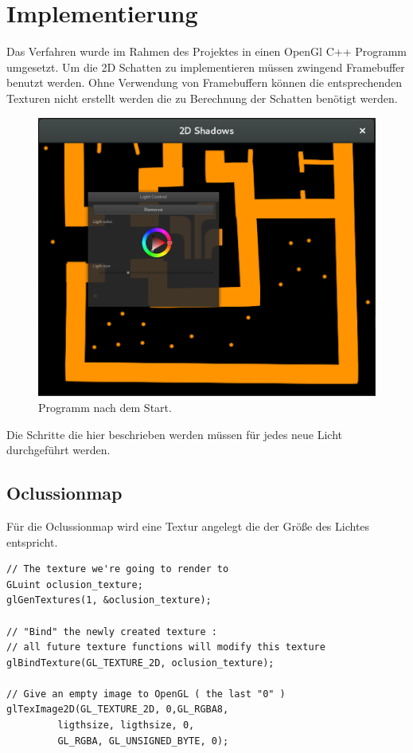 \chapter{Implementierung}
Das Verfahren wurde im Rahmen des Projektes in einen OpenGl C++ Programm umgesetzt.
Um die 2D Schatten zu implementieren müssen zwingend Framebuffer benutzt werden.
Ohne Verwendung von Framebuffern können die entsprechenden Texturen nicht erstellt werden die zu Berechnung der Schatten benötigt werden. 
\begin{figure}[h]
	\centering
	\includegraphics[scale=0.25]{images/Bildschirmfoto_1.png}
	\caption{Programm nach dem Start.}
	\label{p_1}
\end{figure}

Die Schritte die hier beschrieben werden müssen für jedes neue Licht durchgeführt werden.
\newpage
\section{Oclussionmap}

Für die Oclussionmap wird eine Textur angelegt die der Größe des Lichtes entspricht.
\begin{lstlisting}
// The texture we're going to render to
GLuint oclusion_texture;
glGenTextures(1, &oclusion_texture);

// "Bind" the newly created texture : 
// all future texture functions will modify this texture
glBindTexture(GL_TEXTURE_2D, oclusion_texture);

// Give an empty image to OpenGL ( the last "0" )
glTexImage2D(GL_TEXTURE_2D, 0,GL_RGBA8,
		 ligthsize, ligthsize, 0,
		 GL_RGBA, GL_UNSIGNED_BYTE, 0);
\end{lstlisting}

